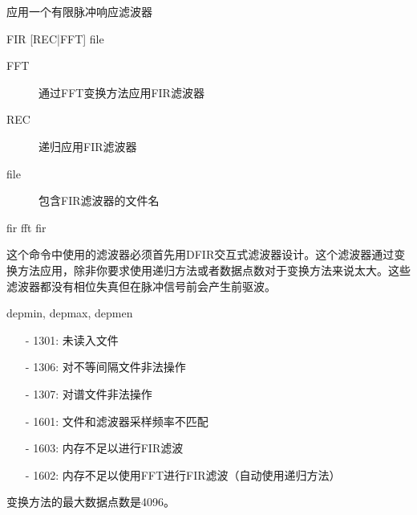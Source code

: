 \label{cmd:fir}

应用一个有限脉冲响应滤波器

\begin{SACSTX}
FIR [REC|FFT] file
\end{SACSTX}

\begin{description}
\item [FFT] 通过FFT变换方法应用FIR滤波器
\item [REC] 递归应用FIR滤波器
\item [file] 包含FIR滤波器的文件名
\end{description}
 
\begin{SACDFT}
fir fft fir
\end{SACDFT}

这个命令中使用的滤波器必须首先用DFIR交互式滤波器设计。这个滤波器通过变换方法应用，除非你要求使用递归方法或者数据点数对于变换方法来说太大。这些滤波器都没有相位失真但在脉冲信号前会产生前驱波。

depmin, depmax, depmen

\begin{itemize}
\item[-]1301: 未读入文件
\item[-]1306: 对不等间隔文件非法操作
\item[-]1307: 对谱文件非法操作
\item[-]1601: 文件和滤波器采样频率不匹配
\item[-]1603: 内存不足以进行FIR滤波
\end{itemize}

\begin{itemize}
\item[-]1602: 内存不足以使用FFT进行FIR滤波（自动使用递归方法）
\end{itemize}

变换方法的最大数据点数是4096。
